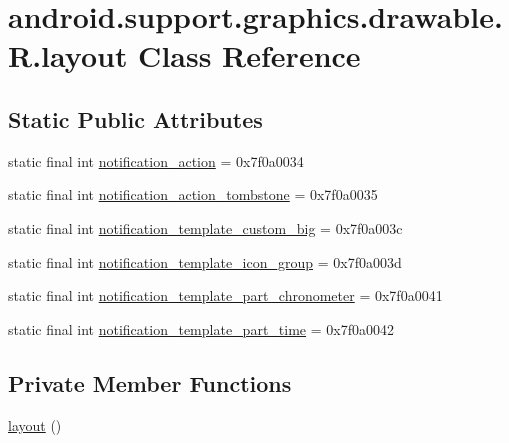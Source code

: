 \hypertarget{classandroid_1_1support_1_1graphics_1_1drawable_1_1_r_1_1layout}{}\section{android.\+support.\+graphics.\+drawable.\+R.\+layout Class Reference}
\label{classandroid_1_1support_1_1graphics_1_1drawable_1_1_r_1_1layout}
\subsection*{Static Public Attributes}
\begin{DoxyCompactItemize}
\item 
static final int \mbox{\hyperlink{classandroid_1_1support_1_1graphics_1_1drawable_1_1_r_1_1layout_a8c635c00891f90c0a7021c4643c79d10}{notification\+\_\+action}} = 0x7f0a0034
\item 
static final int \mbox{\hyperlink{classandroid_1_1support_1_1graphics_1_1drawable_1_1_r_1_1layout_a6a02543ca15d3b112916f168117797cf}{notification\+\_\+action\+\_\+tombstone}} = 0x7f0a0035
\item 
static final int \mbox{\hyperlink{classandroid_1_1support_1_1graphics_1_1drawable_1_1_r_1_1layout_a915e2f61869cd92504f89d23e8103f8a}{notification\+\_\+template\+\_\+custom\+\_\+big}} = 0x7f0a003c
\item 
static final int \mbox{\hyperlink{classandroid_1_1support_1_1graphics_1_1drawable_1_1_r_1_1layout_a20955748ee8168fb8ea82f1147421575}{notification\+\_\+template\+\_\+icon\+\_\+group}} = 0x7f0a003d
\item 
static final int \mbox{\hyperlink{classandroid_1_1support_1_1graphics_1_1drawable_1_1_r_1_1layout_ab27345b5d740a94a73736a05f2650143}{notification\+\_\+template\+\_\+part\+\_\+chronometer}} = 0x7f0a0041
\item 
static final int \mbox{\hyperlink{classandroid_1_1support_1_1graphics_1_1drawable_1_1_r_1_1layout_a0e956654a5b88f1e4236cf0f3b58eeb6}{notification\+\_\+template\+\_\+part\+\_\+time}} = 0x7f0a0042
\end{DoxyCompactItemize}
\subsection*{Private Member Functions}
\begin{DoxyCompactItemize}
\item 
\mbox{\hyperlink{classandroid_1_1support_1_1graphics_1_1drawable_1_1_r_1_1layout_a634482dadf0d30eae8b518748aed3c8f}{layout}} ()
\end{DoxyCompactItemize}


